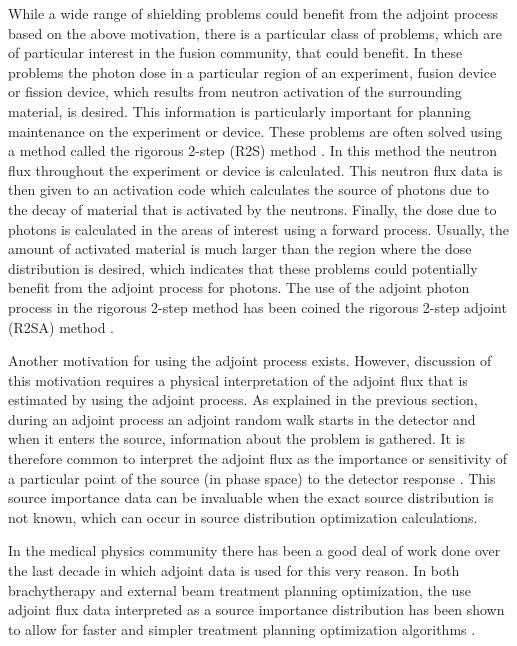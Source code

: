 While a wide range of shielding problems could benefit from the adjoint process 
based on the above motivation, there is a particular class of problems, which 
are of particular interest in the fusion community, that could benefit. In 
these problems the photon dose in a particular region of an experiment, fusion 
device or fission device, which results from neutron activation of the 
surrounding material, is desired. This information is particularly important 
for planning maintenance on the experiment or device. These problems are often 
solved using a method called the rigorous 2-step (R2S) method 
\citep{pereslavtsev_novel_2013, chen_rigorous_2002, robinson_rigorous_2011}. In 
this method the neutron flux throughout the experiment or device is calculated.
This neutron flux data is then given to an activation code which calculates the 
source of photons due to the decay of material that is activated by the 
neutrons. Finally, the dose due to photons is calculated in the areas of 
interest using a forward process. Usually, the amount of activated material is 
much larger than the region where the dose distribution is desired, which 
indicates that these problems could potentially benefit from the adjoint 
process for photons. The use of the adjoint photon process in the 
rigorous 2-step method has been coined the rigorous 2-step adjoint (R2SA) 
method \citep{robinson_rigorous_2011}. 

Another motivation for using the adjoint process exists. However, discussion
of this motivation requires a physical interpretation of the adjoint flux that
is estimated by using the adjoint process. As explained in the previous section,
during an adjoint process an adjoint random walk starts in the detector and when
it enters the source, information about the problem is gathered. It is therefore
common to interpret the adjoint flux as the importance or sensitivity of a 
particular point of the source (in phase space) to the detector response 
\citep{lewis_computational_1993}. This source importance data can be 
invaluable when the exact source distribution is not known, which
can occur in source distribution optimization calculations. 

In the medical physics community there has been a good deal of work done over 
the last decade in which adjoint data is used for this very reason. In both 
brachytherapy and external beam treatment planning optimization, the use 
adjoint flux data interpreted as a source importance distribution has been 
shown to allow for faster and simpler treatment planning optimization 
algorithms 
\citep{yoo_optimization_2003, chaswal_adjoint_2007, wang_adjoint_2005}. 

